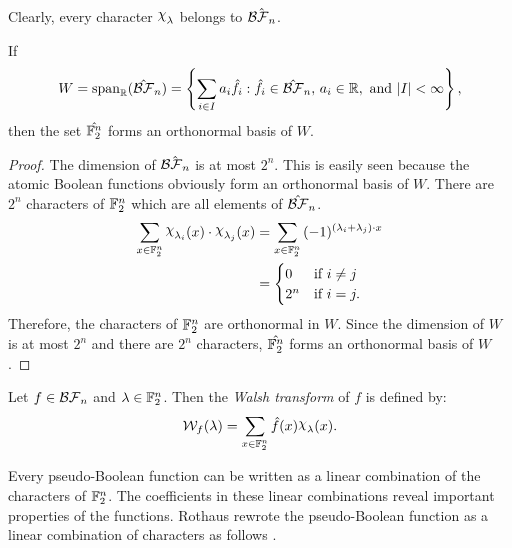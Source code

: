 \par Clearly, every character $\Chi_\lambda$ belongs to $\hat{\mathcal{BF}_n}$.
\begin{lemma}
  If \[W={\rm span}_\rrr(\hat{\BF}_n)=\left\{\sum_{i\in I}a_i\hat{f}_i:
  \hat{f}_i\in\hat{\BF}_n{\rm ,\ }a_i\in\rrr{\rm ,\ and\ }|I|<\infty\right\},\]
  then the set $\hat{\mathbb{F}_2^n}$ forms an orthonormal basis of $W$.
\end{lemma}
\begin{proof}
	The dimension of $\hat{\mathcal{BF}_n}$ is at most $2^n$. This is easily seen because
	the atomic Boolean functions obviously form an orthonormal basis of $W$.
	There are $2^n$ characters of $\mathbb{F}_2^n$ which are all elements of
	$\hat{\mathcal{BF}}_n$.
  \begin{align*}
    \sum_{x\in\gftwo^n}{\Chi_{\lambda_i}(x)\cdot\Chi_{\lambda_j}(x)}
    &=\sum_{x\in\gftwo^n}
      {(-1)^{(\lambda_i+\lambda_j)\cdot x}}\\
    &=\begin{cases}
      0 & \text{if } i\not=j \\
      2^n & \text{if } i=j.
    \end{cases}
  \end{align*}
  Therefore, the characters of $\mathbb{F}_2^n$ are orthonormal in $W$. Since the
	dimension of $W$ is at most $2^n$ and there are $2^n$ characters,
	$\hat{\mathbb{F}_2^n}$ forms an orthonormal basis of $W$.
\end{proof}


\begin{definition}\label{def:walsh}
  Let $f\in\mathcal{BF}_n$ and $\lambda\in\mathbb{F}_2^n$. Then the {\em Walsh transform}
  of $f$ is defined by:
  \begin{equation}\label{eqn:walsh}
    \mathcal{W}_f(\lambda)=\sum_{x\in\gftwo^n}\hat{f}(x)\Chi_\lambda(x).
  \end{equation}
\end{definition}

\par Every pseudo-Boolean function can be written as a linear combination of
the characters of $\mathbb{F}_2^n$. The coefficients in these linear combinations
reveal important properties of the functions. Rothaus rewrote the
pseudo-Boolean function as a linear combination of characters
as follows \cite{art:r76}. 

